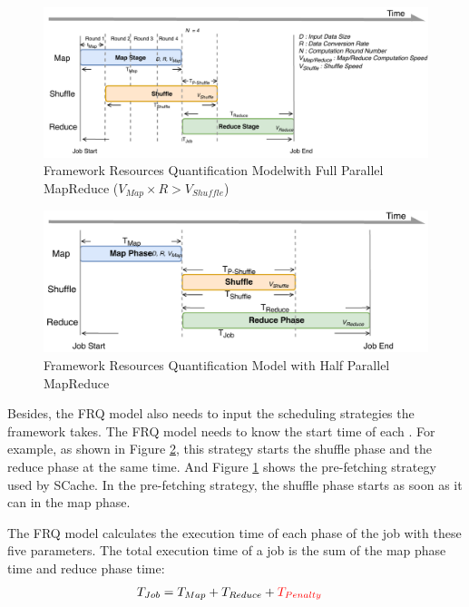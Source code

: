 {\begin{figure}
    \centering
	\includegraphics[width=\linewidth]{fig/model_basic}
	\caption{\color{black}Framework Resources Quantification Model\newline with Full Parallel MapReduce (\(V_{Map} \times R > V_{Shuffle}\))}
    \label{fig:model_basic}
\end{figure}
\begin{figure}
	\centering
	\includegraphics[width=\linewidth]{fig/model_hadoop}
	\caption{\color{black}Framework Resources Quantification Model with Half Parallel MapReduce}
	\label{fig:model_hadoop}
\end{figure}

{\color{black}
Besides, the FRQ model also needs to input the scheduling strategies the framework takes.
The FRQ model needs to know the start time of each .
For example, as shown in Figure \ref{fig:model_hadoop}, this strategy starts the shuffle phase and the reduce phase at the same time.
And Figure \ref{fig:model_basic} shows the pre-fetching strategy used by SCache. In the pre-fetching strategy, the shuffle phase starts as soon as it can in the map phase.
}

The FRQ model calculates the execution time of each phase of the job with these five parameters.
The total execution time of a job is the sum of the map phase time and reduce phase time:
\begin{equation}
\label{equation_Tjob}
\begin{aligned}
    T_{Job} &= T_{Map} + T_{Reduce} + {\color{red}{}T_{Penalty}}
\end{aligned}
\end{equation}

}
